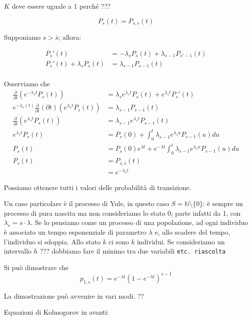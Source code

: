 \documentclass[a4paper,12pt]{book}
\begin{document}
$ K $ deve essere uguale a 1 perché ??? %

$$ P_s(t) = P_{\bar{s},s}(t) $$

Supponiamo $ s > \bar{s} $; allora:

\begin{align*}
	P_s'(t) & = -\lambda_s P_s(t) + \lambda_{s-1}P_{s'-1}(t) \\ %
	P_s'(t) + \lambda_s P_s(t) & = \lambda_{s-1} P_{s-1}(t) \\
\end{align*}

Osserviamo che 
\begin{align*}
	\frac{\partial}{\partial t}(e^{-\lambda_s t} P_s(t)) & = \lambda_s e^{\lambda_s t} P_s(t) + e^{\lambda_s t}P_s'(t) \\
	e^{-\lambda_s(t)} \frac{\partial}{\partial t}(\partial t)(e^{\lambda_s t}P_s(t)) & = \lambda_{s-1} P_{s-1}(t) \\
	\frac{\partial}{\partial t}(e^{\lambda_s t} P_s(t)) & = \lambda_{s-1}e^{\lambda_s t} P_{s-1}(t) \\
	e^{\lambda_s t}P_s(t) & = P_s(0) + \int_{0}^{t} \lambda_{s-1}e^{\lambda_s u} P_{s-1}(u) du \\
	P_s(t) & = P_s(0) e^{\lambda t} + e^{-\lambda t} \int_0^t \lambda_{s-1} e^{\lambda_s u} P_{s-1}(u)du \\
	P_s(t) & = P_{\bar{s}, \bar{s}}(t) \\
	& = e^{-\lambda_{\bar{s}} t}
\end{align*}

Possiamo ottenere tutti i valori delle probabilità di transizione. 

Un caso particolare è il processo di Yule, in questo caso $ S = \mathbb{N} \setminus \{0\} $: è sempre un processo di pura nascita ma non consideriamo lo stato 0; parte infatti da 1, con $\lambda_s = s\cdot \lambda$. Se lo pensiamo come un processo di una popolazione, ad ogni individuo è associato un tempo esponenziale di parametro $\lambda$ e, allo scadere del tempo, l'individuo si sdoppia. Allo stato $ k $ ci sono $ k $ individui. Se consideriamo un intervallo $ h $ ??? %
dobbiamo fare il minimo tra due variabili \texttt{etc. riascolta} %

Si può dimostrare che 
$$ p_{1,s}(t) = e^{-\lambda t}(1 - e^{-\lambda t})^{s-1} $$

La dimostrazione può avvenire in vari modi. ?? %

Equazioni di Kolmogorov in avanti:
\end{document}
